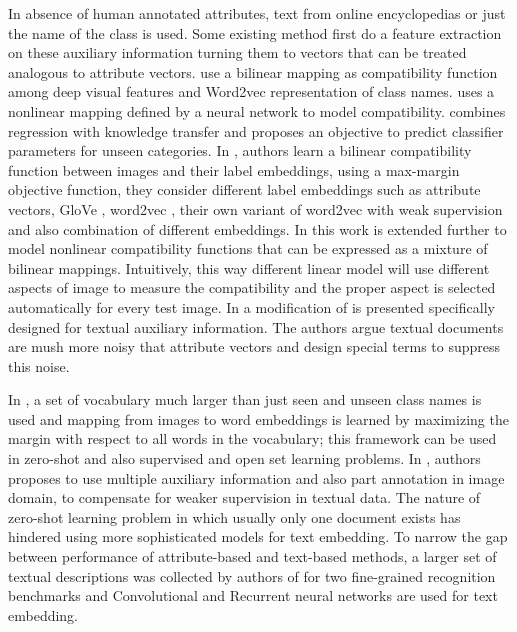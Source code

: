 \documentclass[10pt,twocolumn,letterpaper]{article}
\begin{document}
 In absence of human annotated attributes, text from online encyclopedias or just the name of the class is used. Some existing method
 first do a feature extraction on these auxiliary information turning them to vectors that can be treated analogous to attribute vectors.
 \cite{devise} use a bilinear mapping as compatibility function among deep visual features and Word2vec \cite{word2vec} representation of
 class names. \cite{ba2015} uses a nonlinear mapping defined by a neural network to model compatibility.
  \cite{mohamed13} combines regression with knowledge transfer and proposes an objective to predict classifier parameters
 for unseen categories.
 In \cite{Akata2015}, authors learn a bilinear compatibility function between images and their label embeddings, using a max-margin objective function, they
 consider different label embeddings such as attribute vectors, GloVe \cite{pennington2014glove}, word2vec \cite{word2vec}, their own variant of word2vec with weak supervision and also combination of different embeddings.
In \cite{Xian2016} this work is extended further
to model nonlinear compatibility functions that can be expressed as a mixture of bilinear mappings. Intuitively, this way
different linear model will use different aspects of image to measure the compatibility and the proper aspect is selected automatically for every test image.
  In \cite{Qiao2016} a modification of \cite{emb15} is presented specifically designed for textual auxiliary information. The authors
  argue textual documents are mush more noisy that attribute vectors and design special terms to suppress this noise.

In \cite{Fu2016}, a set of vocabulary much larger than just seen and unseen class names is used and mapping from images to word embeddings is learned
by  maximizing the margin with respect to all words in the vocabulary; this framework can be used in zero-shot and also supervised and open set learning problems.
In  \cite{Akata2016}, authors proposes to use multiple auxiliary information and also  part annotation in image domain,
 to compensate for weaker supervision in textual data.
The nature of zero-shot learning problem in which usually only one document exists has hindered using more sophisticated models for text embedding.
To narrow the gap between performance of attribute-based and text-based methods, a larger set of textual descriptions was collected
by authors of \cite{Akata2016rnn} for two fine-grained recognition benchmarks and Convolutional and Recurrent neural networks are used for text embedding.
\end{document}
